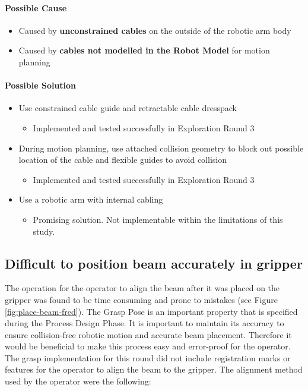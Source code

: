 \paragraph{Possible Cause}

\begin{itemize}
    \item Caused by \textbf{unconstrained cables} on the outside of the robotic arm body
    \item Caused by \textbf{cables not modelled in the Robot Model} for motion planning
\end{itemize}

\paragraph{Possible Solution}
\begin{itemize}
    \item Use constrained cable guide and retractable cable dresspack
    \begin{itemize}
        \item Implemented and tested successfully in Exploration Round 3 
    \end{itemize}
    \item During motion planning, use attached collision geometry to block out possible location of the cable and flexible guides to avoid collision
    \begin{itemize}
        \item Implemented and tested successfully in Exploration Round 3 
    \end{itemize}
    \item Use a robotic arm with internal cabling
    \begin{itemize}
        \item Promising solution. Not implementable within the limitations of this study.
    \end{itemize}
\end{itemize}

\subsection{Difficult to position beam accurately in gripper}
\label{subsection:exploration-2-difficult-to-position-beam-accurately-in-gripper}

The operation for the operator to align the beam after it was placed on the gripper was found to be time consuming and prone to mistakes (see Figure \ref{fig:place-beam-fred}). The Grasp Pose is an important property that is specified during the Process Design Phase. It is important to maintain its accuracy to ensure collision-free robotic motion and accurate beam placement. Therefore it would be beneficial to make this process easy and error-proof for the operator. The grasp implementation for this round did not include registration marks or features for the operator to align the beam to the gripper. The alignment method used by the operator were the following:

